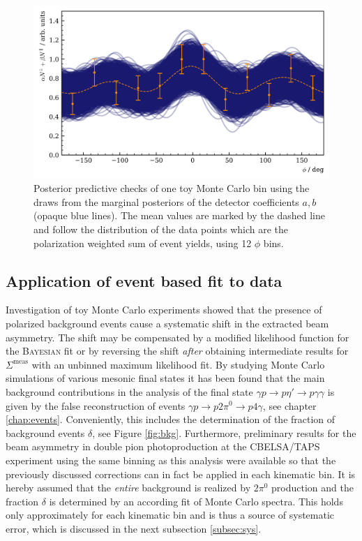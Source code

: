 \begin{figure}[htbp]
	\centering
	\includegraphics[width=\linewidth]{../bayes/etap_event_based_fit/plots/toyMC_eff_PPC.png}
	\caption{Posterior predictive checks of one toy Monte Carlo bin using the draws from the marginal posteriors of the detector coefficients $a,b$ (opaque blue lines). The mean values are marked by the dashed line and follow the distribution of the data points which are the polarization weighted sum of event yields, using 12 $\phi$ bins.}	
	\label{fig:toyMC_eff}
\end{figure}

\subsection{Application of event based fit to data}
Investigation of toy Monte Carlo experiments showed that the presence of polarized background events cause a systematic shift in the extracted beam asymmetry. The shift may be compensated by a modified likelihood function for the \textsc{Bayesian} fit or by reversing the shift \emph{after} obtaining intermediate results for $\Sigma^\text{meas}$ with an unbinned maximum likelihood fit. By studying Monte Carlo simulations of various mesonic final states it has been found that the main background contributions in the analysis of the final state $\gamma p \to p\eta'\to p\gamma\gamma$ is given by the false reconstruction of events $\gamma p \to p 2\pi^0\to p 4\gamma$, see chapter \ref{chap:events}. Conveniently, this includes the determination of the fraction of background events $\delta$, see Figure \ref{fig:bkg}. Furthermore, preliminary results for the beam asymmetry in double pion photoproduction at the CBELSA/TAPS experiment using the same binning as this analysis \cite{mahlbergphd} were available so that the previously discussed corrections can in fact be applied in each kinematic bin. It is hereby assumed that the \emph{entire} background is realized by $2\pi^0$ production and the fraction $\delta$ is determined by an according fit of Monte Carlo spectra. This holds only approximately for each kinematic bin and is thus a source of systematic error, which is discussed in the next subsection \ref{subsec:sys}.

